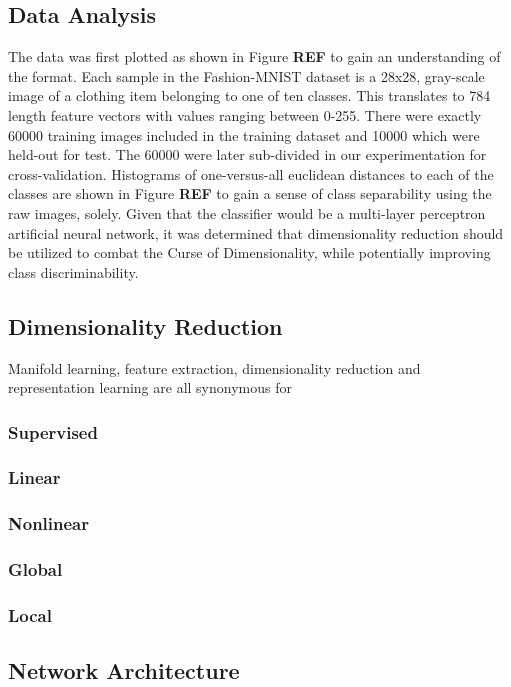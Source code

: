 \documentclass[conference]{IEEEtran}
\begin{document}
	\subsection{Data Analysis}
	The data was first plotted as shown in Figure \textbf{REF} to gain an understanding of the format.  Each sample in the Fashion-MNIST dataset is a 28x28, gray-scale image of a clothing item belonging to one of ten classes. This translates to 784 length feature vectors with values ranging between 0-255. There were exactly 60000 training images included in the  training dataset and 10000 which were held-out for test.  The 60000 were later sub-divided in our experimentation for cross-validation. Histograms of one-versus-all euclidean distances to each of the classes are shown in Figure \textbf{REF} to gain a sense of class separability using the raw images, solely.  Given that the classifier would be a multi-layer perceptron artificial neural network, it was determined that dimensionality reduction should be utilized to combat the Curse of Dimensionality, while potentially improving class discriminability.
	
	\subsection{Dimensionality Reduction}
	Manifold learning, feature extraction, dimensionality reduction and representation learning are all synonymous for  
	
	\subsubsection*{Supervised}
	\subsubsection*{Linear}
	\subsubsection*{Nonlinear}
	\subsubsection*{Global}
	\subsubsection*{Local}
	
	\subsection{Network Architecture}
	
\end{document}
